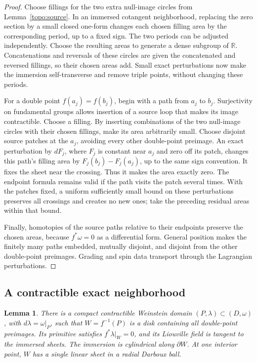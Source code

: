 \documentclass[11pt]{article}
\numberwithin{equation}{section}
\newtheorem{lemma}[theorem]{Lemma}
\theoremstyle{definition}
\theoremstyle{remark}
\newcommand{\R}{\mathbb R}
\begin{document}
\begin{proof}
Choose fillings for the two extra null-image circles from
Lemma~\ref{topo:source}.  In an immersed cotangent neighborhood,
replacing the zero section by a small closed one-form changes each
chosen filling area by the corresponding period, up to a fixed
sign.  The two periods can be adjusted independently.  Choose
the resulting areas to generate a dense subgroup of $\R$.
Concatenations and reversals of these circles are given the
concatenated and reversed fillings, so their chosen areas add.
Small exact perturbations now make the immersion self-transverse
and remove triple points, without changing these periods.

For a double point $f(a_j)=f(b_j)$, begin with a path from $a_j$
to $b_j$.  Surjectivity on fundamental groups allows insertion of
a source loop that makes its image contractible.  Choose a filling.
By inserting combinations of the two null-image circles with their
chosen fillings, make its area arbitrarily small.  Choose disjoint
source patches at the $a_j$, avoiding every other double-point
preimage.  An exact perturbation by $dF_j$, where $F_j$ is constant
near $a_j$ and zero off its patch, changes this path's filling area
by $F_j(b_j)-F_j(a_j)$, up to the same sign convention.  It fixes
the sheet near the crossing.  Thus it makes the area exactly zero.
The endpoint formula remains valid if the path visits the patch
several times.  With the patches fixed, a uniform sufficiently
small bound on these perturbations preserves all crossings and
creates no new ones; take the preceding residual areas within that
bound.

Finally, homotopies of the source paths relative to their endpoints
preserve the chosen areas, because $f^*\omega=0$ as a differential
form.  General position makes the finitely many paths embedded,
mutually disjoint, and disjoint from the other double-point
preimages.  Grading and spin data transport through the
Lagrangian perturbations.
\end{proof}

\subsection{A contractible exact neighborhood}

\begin{lemma}\label{topo:exact-domain}
There is a compact contractible Weinstein domain
$(P,\lambda)\subset(D,\omega)$, with $d\lambda=\omega|_P$, such that
$W=f^{-1}(P)$ is a disk
containing all double-point preimages.  Its primitive satisfies
$f^*\lambda|_W=0$, and its Liouville field is tangent to the
immersed sheets.  The immersion is cylindrical along $\partial W$.
At one interior point, $W$ has a single linear sheet in a radial
Darboux ball.
\end{lemma}
\end{document}
